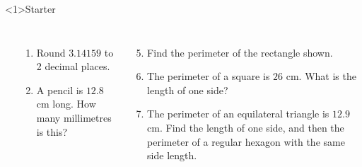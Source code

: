 \documentclass{beamer}
\newcommand{\ablank}[1]{%
  \alt<2>{\textcolor{red}{#1}}{\underline{\phantom{#1}}}%
}
\newcommand{\ashow}[1]{\uncover<2->{\textcolor{red}{\small #1}}}
\newcommand{\ashowq}[1]{\alt<2->{\textcolor{red}{\small #1}}{?}}
\begin{document}
\begin{frame}<1>{Starter}


\begin{columns}

\begin{center}
\end{center}

\small
\begin{enumerate}
  \item Round $3.14159$ to 2 decimal places. \ashow{3.14}
  \item A pencil is $12.8$ cm long. How many millimetres is this? \ablank{128 mm}
\end{enumerate}

\begin{enumerate}
  \setcounter{enumi}{4}
  \item Find the perimeter of the rectangle shown. \ashow{25.4 cm}
  \item The perimeter of a square is $26$ cm. What is the length of one side? \ashow{6.5 cm}
  \item  The perimeter of an equilateral triangle is $12.9$ cm. 
    Find the length of one side, and then the perimeter of a regular hexagon with the same side length. \ashow{$4.3$ cm; hexagon: $25.8$ cm}
\end{enumerate}

\end{columns}
\end{frame}
\end{document}

